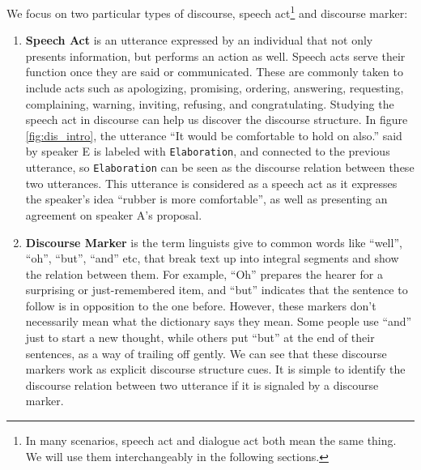 We focus on two particular types of discourse, speech act\footnote{In many scenarios, speech act and dialogue act both mean the same thing. We will use them interchangeably in the following sections.} and discourse marker:

\begin{enumerate}
    \item \textbf{Speech Act} is an utterance expressed by an individual that not only presents information, but performs an action as well. %
    Speech acts serve their function once they are said or communicated. These are commonly taken to include acts such as apologizing, promising, ordering, answering, requesting, complaining, warning, inviting, refusing, and congratulating. Studying the speech act in discourse can help us discover the discourse structure. In figure \ref{fig:dis_intro}, the utterance ``It would be comfortable to hold on also.'' said by speaker E is labeled with \texttt{Elaboration}, and connected to the previous utterance, so \texttt{Elaboration} can be seen as the discourse relation between these two utterances. This utterance is considered as a speech act as it expresses the speaker's idea ``rubber is more comfortable'', as well as presenting an agreement on speaker A's proposal.
    
    \item \textbf{Discourse Marker} is the term linguists give to common words like ``well'', ``oh'', ``but'', ``and'' etc, that break text up into integral segments and show the relation between them. For example, ``Oh'' prepares the hearer for a surprising or just-remembered item, and ``but'' indicates that the sentence to follow is in opposition to the one before. However, these markers don't necessarily mean what the dictionary says they mean. Some people use ``and'' just to start a new thought, while others put ``but'' at the end of their sentences, as a way of trailing off gently. We can see that these discourse markers work as explicit discourse structure cues. It is simple to identify the discourse relation between two utterance if it is signaled by a discourse marker. %
\end{enumerate}

